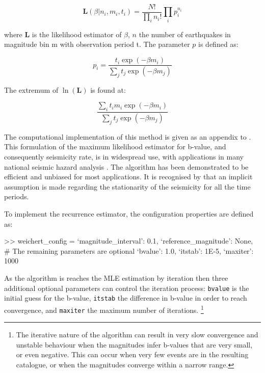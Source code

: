 \begin{equation}
   \mathbf{L} \left( {\beta | n_i, m_i, t_i} \right) = \frac{ N!}{\prod_i n_i!} \prod_i p_{i}^{n_i}
\end{equation}

where $\mathbf{L}$ is the likelihood estimator of $\beta$, $n$ the number of earthquakes in magnitude bin m with observation period t. The parameter $p$ is defined as:

\begin{equation}
   p_i = \frac{t_i \exp \left( {-\beta m_i} \right) }{\sum_j t_j \exp \left( {-\beta m_j} \right)}
\end{equation}

The extremum of $\ln \left( {\mathbf{L}}\right)$ is found at:

\begin{equation} 
   \frac{\sum_i t_i m_i \exp \left( {-\beta m_i} \right)}{\sum_j t_j \exp \left( {-\beta m_j} \right)}
\end{equation}

The computational implementation of this method is given as an appendix to \textcite{Weichert1980}. This formulation of the maximum likelihood estimator for b-value, and consequently seismicity rate, is in widespread use, with applications in many national seismic hazard analysis \parencite[e.g.][]{usgsNSHM1996,usgsNSHM2002}. The algorithm has been demonstrated to be efficient and unbiased for most applications. It is recognised by \textcite{Felzer2008} that an implicit assumption is made regarding the stationarity of the seismicity for all the time periods. 

To implement the \textcite{Weichert1980} recurrence estimator, the configuration properties are defined as:

\begin{python}[frame=single]

>> weichert_config = {`magnitude_interval': 0.1,
                      `reference_magnitude': None,
                      # The remaining parameters are optional
                      `bvalue': 1.0,
                      `itstab': 1E-5,
                      `maxiter': 1000}
\end{python}

As the \textcite{Weichert1980} algorithm is reaches the MLE estimation by iteration then three additional optional parameters can control the iteration process: \verb=bvalue= is the initial guess for the b-value, \verb=itstab= the difference in b-value in order to reach convergence, and \verb=maxiter= the maximum number of iterations. \footnote{The iterative nature of the \textcite{Weichert1980} algorithm can result in very slow convergence and unstable behaviour when the magnitudes infer b-values that are very small, or even negative. This can occur when very few events are in the resulting catalogue, or when the magnitudes converge within a narrow range.}




